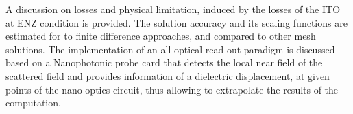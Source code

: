 \par A discussion on losses and physical limitation, induced by the losses of the ITO at ENZ condition is provided. The solution accuracy and its scaling functions are estimated for to finite difference approaches, and compared to other mesh solutions. The implementation of an all optical read-out paradigm is discussed based on a Nanophotonic \gls{probe card} that detects the local near field of the scattered field and provides information of a dielectric displacement, at given points of the nano-optics circuit, thus allowing to extrapolate the results of the computation. 
